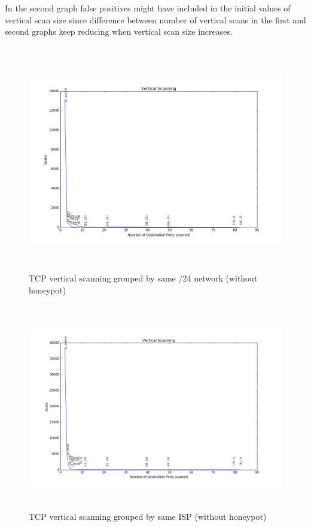 In the second graph false positives might have included in the initial values of vertical scan size since difference between number of vertical scans in the first and second graphs keep reducing when vertical scan size increases.
\\\\
\begin{figure}[p]
\centering
\includegraphics[width=15cm,height=9cm]{images/vertical_scans_jan_classc}
\caption{ TCP vertical scanning grouped by same /24 network (without honeypot)}
\centering
\includegraphics[width=15cm,height=9cm]{images/vertical_scans_jan_isp}
\caption{ TCP vertical scanning grouped by same ISP (without honeypot)}
\end{figure}
